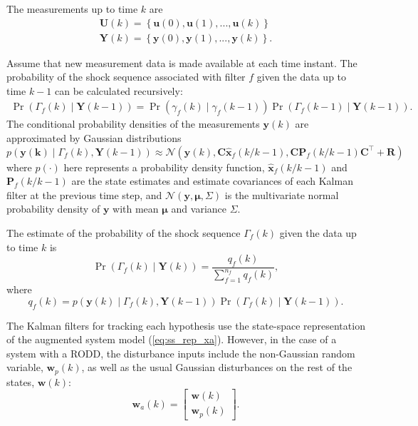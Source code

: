 The measurements up to time $k$ are
\begin{equation} \label{eq:Uk_Yk}
	\begin{aligned}
		\mathbf{U}(k)=\left\{\mathbf{u}(0), \mathbf{u}(1), ..., \mathbf{u}(k) \right\} \\
		\mathbf{Y}(k)=\left\{\mathbf{y}(0), \mathbf{y}(1), ..., \mathbf{y}(k) \right\}.
	\end{aligned}
\end{equation}

Assume that new measurement data is made available at each time instant. The probability of the shock sequence associated with filter $f$ given the data up to time $k-1$ can be calculated recursively:
\begin{multline} \label{eq:Pr_Gammakp1_given_Yk}
	\Pr(\Gamma_f(k) \mid \mathbf{Y}(k-1)) = 
	\Pr(\gamma_f(k) \mid \gamma_f(k-1)) \Pr(\Gamma_f(k-1) \mid \mathbf{Y}(k-1)).
\end{multline}
The conditional probability densities of the measurements $\mathbf{y}(k)$ are approximated by Gaussian distributions
\begin{equation} \label{eq:p_yk_given_Gammak_Ykm1}
	p(\mathbf{y(k)} \mid \Gamma_f(k), \mathbf{Y}(k-1)) \approx
	\mathcal{N}\left(\mathbf{y}(k), \mathbf{C} \mathbf{\hat{x}}_{f}(k/k-1), \mathbf{C} \mathbf{P}_f(k/k-1) \mathbf{C}^\intercal+\mathbf{R}\right)
\end{equation}
where $p(\cdot)$ here represents a probability density function, $\mathbf{\hat{x}}_{f}(k/k-1)$ and $\mathbf{P}_f(k/k-1)$ are the state estimates and estimate covariances of each Kalman filter at the previous time step, and $\mathcal{N}(\mathbf{y}, \mathbf{\mu}, \Sigma)$ is the multivariate normal probability density of $\mathbf{y}$ with mean $\mathbf{\mu}$ and variance $\Sigma$.

The estimate of the probability of the shock sequence $\Gamma_f(k)$ given the data up to time $k$ is
\begin{equation} \label{eq:Pr_Gammak_given_Yk}
	\Pr(\Gamma_f(k) \mid \mathbf{Y}(k)) = \frac{q_f(k)}{\sum_{f=1}^{n_f} q_f(k)},
\end{equation}
where
\begin{equation} \label{eq:qfk}
	q_f(k) = p(\mathbf{y}(k) \mid \Gamma_f(k), \mathbf{Y}(k-1)) \Pr(\Gamma_f(k) \mid \mathbf{Y}(k-1)).
\end{equation}

The Kalman filters for tracking each hypothesis use the state-space representation of the augmented system model (\ref{eq:ss_rep_xa}). 
However, in the case of a system with a RODD, the disturbance inputs include the non-Gaussian random variable, $\mathbf{w}_p(k)$, as well as the usual Gaussian disturbances on the rest of the states, $\mathbf{w}(k)$:
\begin{equation} \label{eq:wak}
	\mathbf{w}_a(k) = \begin{bmatrix}
		\mathbf{w}(k) \\
		\mathbf{w}_p(k)
	\end{bmatrix}.
\end{equation}

